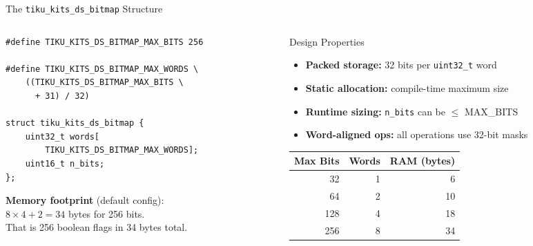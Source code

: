 \documentclass[aspectratio=169, 10pt]{beamer}
\begin{document}
\begin{frame}[fragile]{The \texttt{tiku\_kits\_ds\_bitmap} Structure}
\begin{columns}[T]
\begin{column}{0.48\textwidth}
\begin{lstlisting}[style=cstyle,
  title={ds/bitmap/tiku\_kits\_ds\_bitmap.h}]
#define TIKU_KITS_DS_BITMAP_MAX_BITS 256

#define TIKU_KITS_DS_BITMAP_MAX_WORDS \
    ((TIKU_KITS_DS_BITMAP_MAX_BITS \
      + 31) / 32)

struct tiku_kits_ds_bitmap {
    uint32_t words[
        TIKU_KITS_DS_BITMAP_MAX_WORDS];
    uint16_t n_bits;
};
\end{lstlisting}

\vspace{0.3em}
\textbf{Memory footprint} (default config):\\
$8 \times 4 + 2 = 34$ bytes for 256 bits.\\
That is 256 boolean flags in 34 bytes total.
\end{column}

\begin{column}{0.48\textwidth}
\begin{block}{Design Properties}
\begin{itemize}
  \item \textbf{Packed storage:} 32 bits per \texttt{uint32\_t} word
  \item \textbf{Static allocation:} compile-time maximum size
  \item \textbf{Runtime sizing:} \texttt{n\_bits} can be $\leq$ MAX\_BITS
  \item \textbf{Word-aligned ops:} all operations use 32-bit masks
\end{itemize}
\end{block}

\vspace{0.3em}
\begin{table}
\centering
\scriptsize
\begin{tabular}{@{}rrr@{}}
\toprule
\textbf{Max Bits} & \textbf{Words} & \textbf{RAM (bytes)} \\
\midrule
32  & 1  & 6 \\
64  & 2  & 10 \\
128 & 4  & 18 \\
256 & 8  & 34 \\
\bottomrule
\end{tabular}
\end{table}
\end{column}
\end{columns}
\end{frame}
\end{document}
